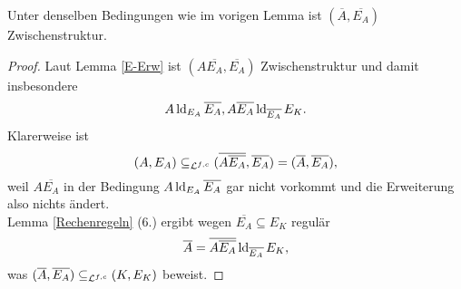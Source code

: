     \begin{lemma}\label{alg Abschl}
    	Unter denselben Bedingungen wie im vorigen Lemma ist $(\overline{A},\overline{E_A})$ Zwischenstruktur.
    \end{lemma}
    \begin{proof}
    	Laut Lemma \ref{E-Erw} ist $(A\overline{E_A},\overline{E_A})$ Zwischenstruktur und damit insbesondere $$A\operatorname{ld}_{E_A}\overline{E_A},A\overline{E_A}\operatorname{ld}_{\overline{E_A}}E_K.$$ Klarerweise ist $$(A,E_A)\subseteq_{\mathcal{L}^{f,c}}(\overline{A\overline{E_A}},\overline{E_A})=(\overline{A},\overline{E_A}),$$ weil $A\overline{E_A}$ in der Bedingung $A\operatorname{ld}_{E_A}\overline{E_A}$ gar nicht vorkommt und die Erweiterung also nichts ändert.\\
    	Lemma \ref{Rechenregeln} (6.) ergibt wegen $\overline{E_A}\subseteq E_K$ regulär $$\overline{A}=\overline{A\overline{E_A}}\operatorname{ld}_{\overline{E_A}}E_K,$$ was $(\overline{A},\overline{E_A})\subseteq_{\mathcal{L}^{f,c}}(K,E_K)$ beweist.
    \end{proof}
    

